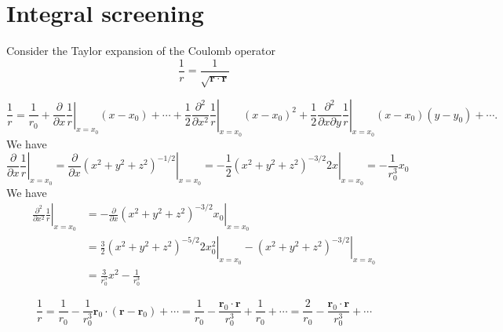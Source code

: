 \documentclass[aip,preprint]{revtex4-1}
\begin{document}
\section{Integral screening}

Consider the Taylor expansion of the Coulomb operator
\begin{equation}
\frac{1}{r} = \frac{1}{\sqrt{\mathbf{r}\cdot \mathbf{r}}}    
\end{equation}

\begin{equation}
\frac{1}{r} = \frac{1}{r_0}
+ \left. \frac{\partial}{\partial x}\frac{1}{r} \right|_{x = x_0} (x - x_0) + \cdots
+ \frac{1}{2}\left. \frac{\partial^2}{\partial x^2}\frac{1}{r} \right|_{x = x_0} (x - x_0)^2
+ \frac{1}{2}\left. \frac{\partial^2}{\partial x \partial y}\frac{1}{r} \right|_{x = x_0} (x - x_0)(y - y_0) + \cdots.
\end{equation}
We have 
\begin{equation}
\left. \frac{\partial}{\partial x}\frac{1}{r} \right|_{x = x_0}
=    
\left. \frac{\partial}{\partial x}(x^2 + y^2 + z^2)^{-1/2} \right|_{x = x_0}
=  -  
\left. \frac{1}{2}(x^2 + y^2 + z^2)^{-3/2} 2 x \right|_{x = x_0}
=-\frac{1}{r_0^3} x_0
\end{equation}
We have 
\begin{equation}
\begin{split}
\left. \frac{\partial^2}{\partial x^2}\frac{1}{r} \right|_{x = x_0}
& = -
\left. \frac{\partial}{\partial x}(x^2 + y^2 + z^2)^{-3/2} x_0 \right|_{x = x_0} \\
& = \frac{3}{2}\left. (x^2 + y^2 + z^2)^{-5/2} 2 x^2_0 \right|_{x = x_0}
 -
\left. (x^2 + y^2 + z^2)^{-3/2} \right|_{x = x_0} \\
&= \frac{3}{r_0^5} x^2 - \frac{1}{r_0^3}
\end{split}
\end{equation}


\begin{equation}
\frac{1}{r} = \frac{1}{r_0} - \frac{1}{r_0^3} \mathbf{r}_0 \cdot (\mathbf{r} - \mathbf{r}_0) + \cdots
=\frac{1}{r_0} - \frac{\mathbf{r}_0 \cdot \mathbf{r}}{r_0^3}
+ \frac{1}{r_0} + \cdots
= \frac{2}{r_0} - \frac{\mathbf{r}_0 \cdot \mathbf{r}}{r_0^3}
 + \cdots 
\end{equation}
\end{document}
